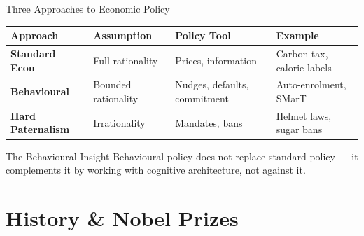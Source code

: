 \documentclass[aspectratio=169]{beamer}
\begin{document}
\begin{frame}{Three Approaches to Economic Policy}
\begin{center}
\begin{tabular}{p{2.5cm}p{3cm}p{3cm}p{3.5cm}}
\toprule
\textbf{Approach} & \textbf{Assumption} & \textbf{Policy Tool} & \textbf{Example}\\
\midrule
\textbf{Standard Econ} & Full rationality & Prices, information & Carbon tax, calorie labels\\[0.5em]
\rowcolor{softpurple}
\textbf{Behavioural} & Bounded rationality & Nudges, defaults, commitment & Auto-enrolment, SMarT\\[0.5em]
\textbf{Hard Paternalism} & Irrationality & Mandates, bans & Helmet laws, sugar bans\\
\bottomrule
\end{tabular}
\end{center}
\medskip
\begin{exampleblock}{The Behavioural Insight}
Behavioural policy does not replace standard policy --- it \alert{complements} it by working with cognitive architecture, not against it.
\end{exampleblock}
\end{frame}

\section{History \& Nobel Prizes}
\end{document}
